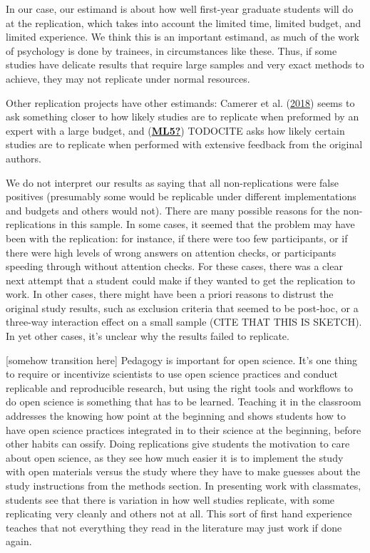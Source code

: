 \documentclass[
  english,
  a4paper,
]{article}
\begin{document}
In our case, our estimand is about how well first-year graduate students will do at the replication, which takes into account the limited time, limited budget, and limited experience. We think this is an important estimand, as much of the work of psychology is done by trainees, in circumstances like these. Thus, if some studies have delicate results that require large samples and very exact methods to achieve, they may not replicate under normal resources.

Other replication projects have other estimands: Camerer et al. (\protect\hyperlink{ref-camerer2018}{2018}) seems to ask something closer to how likely studies are to replicate when preformed by an expert with a large budget, and (\protect\hyperlink{ref-ML5}{\textbf{ML5?}}) TODOCITE asks how likely certain studies are to replicate when performed with extensive feedback from the original authors.

We do not interpret our results as saying that all non-replications were false positives (presumably some would be replicable under different implementations and budgets and others would not). There are many possible reasons for the non-replications in this sample. In some cases, it seemed that the problem may have been with the replication: for instance, if there were too few participants, or if there were high levels of wrong answers on attention checks, or participants speeding through without attention checks. For these cases, there was a clear next attempt that a student could make if they wanted to get the replication to work. In other cases, there might have been a priori reasons to distrust the original study results, such as exclusion criteria that seemed to be post-hoc, or a three-way interaction effect on a small sample (CITE THAT THIS IS SKETCH). In yet other cases, it's unclear why the results failed to replicate.

{[}somehow transition here{]} Pedagogy is important for open science. It's one thing to require or incentivize scientists to use open science practices and conduct replicable and reproducible research, but using the right tools and workflows to do open science is something that has to be learned. Teaching it in the classroom addresses the knowing how point at the beginning and shows students how to have open science practices integrated in to their science at the beginning, before other habits can ossify. Doing replications give students the motivation to care about open science, as they see how much easier it is to implement the study with open materials versus the study where they have to make guesses about the study instructions from the methods section. In presenting work with classmates, students see that there is variation in how well studies replicate, with some replicating very cleanly and others not at all. This sort of first hand experience teaches that not everything they read in the literature may just work if done again.
\end{document}
